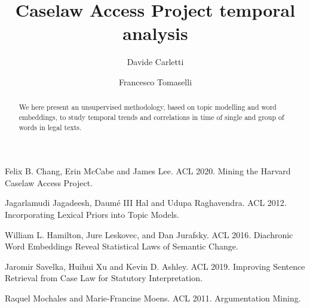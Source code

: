 \documentclass[runningheads]{llncs}
\begin{document}
\title{Caselaw Access Project temporal analysis}

\author{Davide Carletti \and Francesco Tomaselli}
\maketitle

\begin{abstract}
    We here present an unsupervised methodology, based on topic modelling 
    and word embeddings, to study temporal trends and correlations
    in time of single and group of words in legal texts.    
\end{abstract}






\begin{thebibliography}{8}
Felix B. Chang, Erin McCabe and James Lee. ACL 2020. Mining the Harvard Caselaw Access Project.

Jagarlamudi Jagadeesh, Daum{\'e} III Hal and Udupa Raghavendra. ACL 2012. Incorporating Lexical Priors into Topic Models.

William L. Hamilton, Jure Leskovec, and Dan Jurafsky. ACL 2016. Diachronic Word Embeddings Reveal Statistical Laws of Semantic Change. 

Jaromir Savelka, Huihui Xu and Kevin D. Ashley. ACL 2019. Improving Sentence Retrieval from Case Law for Statutory Interpretation.

Raquel Mochales and Marie-Francine Moens. ACL 2011. Argumentation Mining.

\end{thebibliography}
\end{document}
